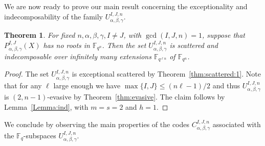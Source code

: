 \documentclass[11pt]{article}
\newtheorem{theorem}[theo]{Theorem}
\theoremstyle{definition}
\numberwithin{equation}{section}
\begin{document}
We are now ready to prove our main result concerning the exceptionality and indecomposability of the family $U_{\alpha, \beta, \gamma}^{I,J,n}$.

\begin{theorem}\label{thm:exceptional_scattered}
For fixed $n, \alpha, \beta, \gamma, I\neq J$, with $\gcd(I,J,n)=1$, suppose that $P_{\alpha,\beta,\gamma}^{I,J}(X)$ has no roots in $\mathbb{F}_{q^n}$. Then the set $U_{\alpha, \beta, \gamma}^{I,J,n}$ is scattered and indecomposable over infinitely many extensions $\mathbb{F}_{q^{\ell n}}$ of $\mathbb{F}_{q^n}$.
\end{theorem}
\begin{proof}
The set $U_{\alpha, \beta, \gamma}^{I,J,n}$ is exceptional scattered by Theorem~\ref{thm:scattered:1}. Note that for any $\ell$ large enough we have $\max\{I,J\} \leq (n\ell-1)/2$ and thus $U_{\alpha, \beta, \gamma}^{I,J,n}$ is $(2,n-1)$-evasive by Theorem~\ref{thm:evasive}. The claim follows by Lemma~\ref{Lemma:ind}, with $m=s=2$ and $h=1$.
\end{proof}


We conclude by observing the main properties of the codes $C_{\alpha, \beta, \gamma}^{I,J,n}$ associated with the $\mathbb{F}_q$-subspaces $U_{\alpha, \beta, \gamma}^{I,J,n}$.
\end{document}
